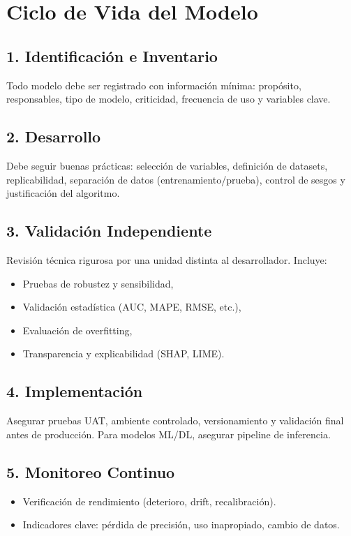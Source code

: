 \documentclass[12pt]{article}
\begin{document}
\section{Ciclo de Vida del Modelo}
\subsection{1. Identificación e Inventario}
Todo modelo debe ser registrado con información mínima: propósito, responsables, tipo de modelo, criticidad, frecuencia de uso y variables clave.

\subsection{2. Desarrollo}
Debe seguir buenas prácticas: selección de variables, definición de datasets, replicabilidad, separación de datos (entrenamiento/prueba), control de sesgos y justificación del algoritmo.

\subsection{3. Validación Independiente}
Revisión técnica rigurosa por una unidad distinta al desarrollador. Incluye:
\begin{itemize}
  \item Pruebas de robustez y sensibilidad,
  \item Validación estadística (AUC, MAPE, RMSE, etc.),
  \item Evaluación de overfitting,
  \item Transparencia y explicabilidad (SHAP, LIME).
\end{itemize}

\subsection{4. Implementación}
Asegurar pruebas UAT, ambiente controlado, versionamiento y validación final antes de producción. Para modelos ML/DL, asegurar pipeline de inferencia.

\subsection{5. Monitoreo Continuo}
\begin{itemize}
  \item Verificación de rendimiento (deterioro, drift, recalibración).
  \item Indicadores clave: pérdida de precisión, uso inapropiado, cambio de datos.
\end{itemize}
\end{document}
